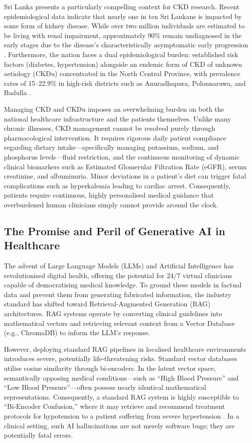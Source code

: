 \documentclass[12pt,a4paper]{report}
\begin{document}
Sri Lanka presents a particularly compelling context for CKD research. Recent epidemiological data indicate that nearly one in ten Sri Lankans is impacted by some form of kidney disease. While over two million individuals are estimated to be living with renal impairment, approximately 90\% remain undiagnosed in the early stages due to the disease's characteristically asymptomatic early progression \cite{Nanayakkara2016}. Furthermore, the nation faces a dual epidemiological burden: established risk factors (diabetes, hypertension) alongside an endemic form of CKD of unknown aetiology (CKDu) concentrated in the North Central Province, with prevalence rates of 15--22.9\% in high-risk districts such as Anuradhapura, Polonnaruwa, and Badulla \cite{Athuraliya2013}.

Managing CKD and CKDu imposes an overwhelming burden on both the national healthcare infrastructure and the patients themselves. Unlike many chronic illnesses, CKD management cannot be resolved purely through pharmacological intervention. It requires rigorous daily patient compliance regarding dietary intake---specifically managing potassium, sodium, and phosphorus levels---fluid restriction, and the continuous monitoring of dynamic clinical biomarkers such as Estimated Glomerular Filtration Rate (eGFR), serum creatinine, and albuminuria. Minor deviations in a patient's diet can trigger fatal complications such as hyperkalemia leading to cardiac arrest. Consequently, patients require continuous, highly personalised medical guidance that overburdened human clinicians simply cannot provide around the clock.

\subsection{The Promise and Peril of Generative AI in Healthcare}

The advent of Large Language Models (LLMs) and Artificial Intelligence has revolutionised digital health, offering the potential for 24/7 virtual clinicians capable of democratising medical knowledge. To ground these models in factual data and prevent them from generating fabricated information, the industry standard has shifted toward Retrieval-Augmented Generation (RAG) architectures. RAG systems operate by converting clinical guidelines into mathematical vectors and retrieving relevant context from a Vector Database (e.g., ChromaDB) to inform the LLM's response.

However, deploying standard RAG pipelines in localised healthcare environments introduces severe, potentially life-threatening risks. Standard vector databases utilise cosine similarity through bi-encoders. In the latent vector space, semantically opposing medical conditions---such as ``High Blood Pressure'' and ``Low Blood Pressure''---often possess nearly identical mathematical representations. Consequently, a standard RAG system is highly susceptible to ``Bi-Encoder Confusion,'' where it may retrieve and recommend treatment protocols for hypotension to a patient suffering from severe hypertension \cite{Lewis2020}. In a clinical setting, such AI hallucinations are not merely software bugs; they are potentially fatal errors.
\end{document}
